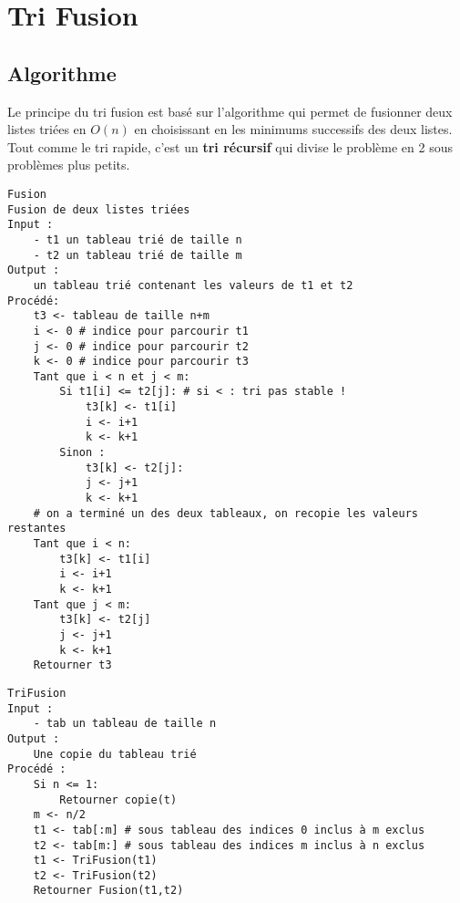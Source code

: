 \documentclass{../cours}
\begin{document}
\section{Tri Fusion}

\subsection{Algorithme}

Le principe du tri fusion est basé sur l'algorithme qui permet de fusionner deux listes triées en $O(n)$ en choisissant en les minimums successifs des deux listes. Tout comme le tri rapide, c'est un \textbf{tri récursif} qui divise le problème en 2 sous problèmes plus petits.

\begin{lstlisting}
Fusion
Fusion de deux listes triées
Input :
    - t1 un tableau trié de taille n
    - t2 un tableau trié de taille m
Output :
    un tableau trié contenant les valeurs de t1 et t2
Procédé:
    t3 <- tableau de taille n+m
    i <- 0 # indice pour parcourir t1
    j <- 0 # indice pour parcourir t2
    k <- 0 # indice pour parcourir t3
    Tant que i < n et j < m:
        Si t1[i] <= t2[j]: # si < : tri pas stable !
            t3[k] <- t1[i]
            i <- i+1
            k <- k+1
        Sinon :
            t3[k] <- t2[j]:
            j <- j+1
            k <- k+1
    # on a terminé un des deux tableaux, on recopie les valeurs restantes
    Tant que i < n:
        t3[k] <- t1[i]
        i <- i+1
        k <- k+1
    Tant que j < m:
        t3[k] <- t2[j]
        j <- j+1
        k <- k+1
    Retourner t3
\end{lstlisting}

\begin{lstlisting}
TriFusion
Input :
    - tab un tableau de taille n
Output :
    Une copie du tableau trié
Procédé :
    Si n <= 1:
        Retourner copie(t)
    m <- n/2
    t1 <- tab[:m] # sous tableau des indices 0 inclus à m exclus
    t2 <- tab[m:] # sous tableau des indices m inclus à n exclus
    t1 <- TriFusion(t1)
    t2 <- TriFusion(t2)
    Retourner Fusion(t1,t2)
\end{lstlisting}
\end{document}

